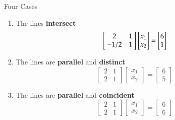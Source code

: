 \documentclass[10pt]{beamer}
\begin{document}
\begin{frame}{Four Cases}

\begin{enumerate}
    \item The lines \textbf{intersect}
        \begin{equation*}
            \left[\negthickspace\begin{array}{cr} 2 & 1 \\ -1/2 & 1 \end{array}\negthickspace\right]
            \begin{bmatrix} x_1 \\ x_2 \end{bmatrix}
            =
            \begin{bmatrix} 6 \\ 1 \end{bmatrix}
        \end{equation*}
    \item The lines are \textbf{parallel} and \textbf{distinct} 
    \begin{equation*}
        \begin{bmatrix} 2 & 1 \\ 2 & 1 \end{bmatrix}
        \begin{bmatrix} x_1 \\ x_2 \end{bmatrix}
        =
        \begin{bmatrix} 6 \\ 5 \end{bmatrix}
    \end{equation*}


\item The lines are \textbf{parallel} and \textbf{coincident} 
\begin{equation*}
    \begin{bmatrix} 2 & 1 \\ 2 & 1 \end{bmatrix}
    \begin{bmatrix} x_1 \\ x_2 \end{bmatrix}
    =
    \begin{bmatrix} 6 \\ 6 \end{bmatrix}
\end{equation*}


\end{enumerate}
\end{frame}
\end{document}
